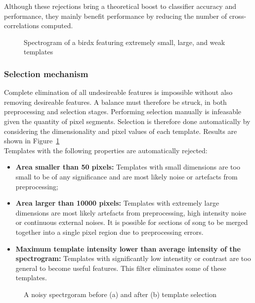 Although these rejections bring a theoretical boost to classifier accuracy and
performance, they mainly benefit performance by reducing the number of
cross-correlations computed.

\begin{figure}[h]
  \centering
  \caption{Spectrogram of a birdx featuring extremely small, large, and weak
  templates}
\end{figure}

\subsubsection{Selection mechanism}
Complete elimination of all undesireable features is impossible without also
removing desireable features.
A balance must therefore be struck, in both preprocessing and selection stages.
Performing selection manually is infeasable given the quantity
of pixel segments.
Selection is therefore done automatically by considering the dimensionality and
pixel values of each template.
Results are shown in Figure~\ref{fig:template_select_effects}\\

Templates with the following properties are automatically rejected:
\begin{itemize}[noitemsep]
  \item \textbf{Area smaller than 50 pixels:} Templates with small dimensions
    are too small to be of any significance and are most likely noise or
    artefacts from preprocessing;

  \item \textbf{Area larger than 10000 pixels:} Templates with extremely large
    dimensions are most likely artefacts from preprocessing, high intensity
    noise or continuous external noises.
    It is possible for sections of song to be merged together into a single
    pixel region due to preprocessing errors.

  \item \textbf{Maximum template intensity lower than average intensity of the
    spectrogram:}
    Templates with significantly low intenstity or contrast are too general to
    become useful features.
    This filter eliminates some of these templates.
\end{itemize}

\begin{figure}[!htb]
  \centering
  \begin{subfigure}[b]{1.0\textwidth}
    \centering
    \caption{}
  \end{subfigure}
  \begin{subfigure}[b]{1.0\textwidth}
    \centering
    \caption{}
  \end{subfigure}
  \caption{A noisy spectrgoram before (a) and after (b) template selection}
  \label{fig:template_select_effects}
\end{figure}

